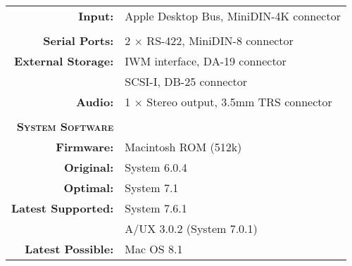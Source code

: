 \begin{tabular}{ r p{6in} }
\\
\textbf{Input:} & Apple Desktop Bus, MiniDIN-4K connector \\
\\
\textbf{Serial Ports:} & 2 \(\times\) RS-422, MiniDIN-8 connector \\
\textbf{External Storage:} & IWM interface, DA-19 connector \\
~ & SCSI-I, DB-25 connector \\
\textbf{Audio:} & 1 \(\times\) Stereo output, 3.5mm TRS connector \\
\\
\textbf{\textsc{System Software}} & ~ \\
\textbf{Firmware:} & Macintosh ROM (512k) \\
\textbf{Original:} & System 6.0.4 \\
\textbf{Optimal:} & System 7.1 \\
\textbf{Latest Supported:} & System 7.6.1 \\
~ & A/UX 3.0.2 (System 7.0.1) \\
\textbf{Latest Possible:} & Mac OS 8.1 \\
\end{tabular}
